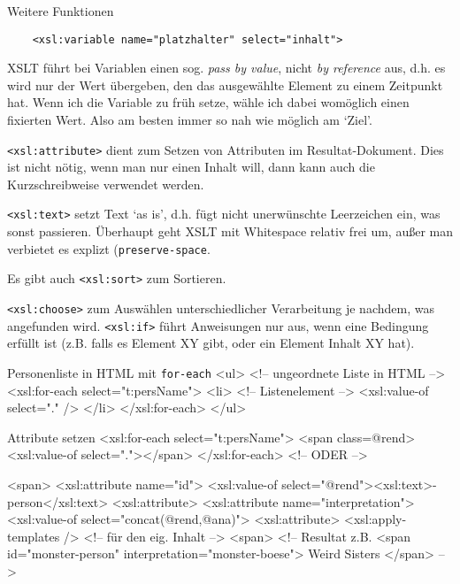 \begin{frame}{Weitere Funktionen}
\begin{verbatim}
    <xsl:variable name="platzhalter" select="inhalt">
\end{verbatim}
XSLT führt bei Variablen einen sog. \emph{pass by value}, nicht \emph{by reference} aus, d.h. es wird nur der Wert übergeben, den das ausgewählte Element zu einem Zeitpunkt hat. Wenn ich die Variable zu früh setze, wähle ich dabei womöglich einen fixierten Wert. Also am besten immer so nah wie möglich am `Ziel'. 
\smallskip

\framebreak

\texttt{<xsl:attribute>} dient zum Setzen von Attributen im Resultat-Dokument. Dies ist nicht nötig, wenn man nur einen Inhalt will, dann kann auch die Kurzschreibweise verwendet werden.
\smallskip

\texttt{<xsl:text>} setzt Text `as is', d.h. fügt nicht unerwünschte Leerzeichen ein, was sonst passieren. Überhaupt geht XSLT mit Whitespace relativ frei um, außer man verbietet es explizt (\texttt{preserve-space}.
\smallskip

Es gibt auch \texttt{<xsl:sort>} zum Sortieren.
\smallskip

\texttt{<xsl:choose>} zum Auswählen unterschiedlicher Verarbeitung je nachdem, was angefunden wird.
\texttt{<xsl:if>} führt Anweisungen nur aus, wenn eine Bedingung erfüllt ist (z.B. falls es Element XY gibt, oder ein Element Inhalt XY hat).


\framebreak

\begin{myxml}{Personenliste in HTML mit \texttt{for-each}}
<ul> <!-- ungeordnete Liste in HTML -->
<xsl:for-each select="t:persName">
    <li> <!-- Listenelement -->
    <xsl:value-of select="." />
    </li>
</xsl:for-each>
</ul>
\end{myxml}

\begin{myxml}{Attribute setzen}
<xsl:for-each select="t:persName">
    <span class={@rend}><xsl:value-of select="."></span>
</xsl:for-each>
<!-- ODER -->

<span>
    <xsl:attribute name="id">
        <xsl:value-of select="@rend"><xsl:text>-person</xsl:text>
    <xsl:attribute>
    <xsl:attribute name="interpretation">
        <xsl:value-of select="concat(@rend,@ana)">
    <xsl:attribute>
    <xsl:apply-templates /> <!-- für den eig. Inhalt -->
<span>
<!-- Resultat z.B. 
    <span id="monster-person" interpretation="monster-boese">
    Weird Sisters </span> -->
\end{myxml}


\end{frame}
